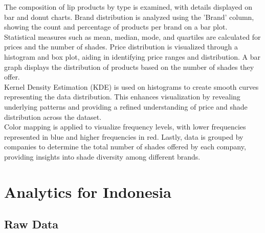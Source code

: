 \documentclass{article}
\begin{document}
\noindent The composition of lip products by type is examined, with details displayed on bar and donut charts. Brand distribution is analyzed using the 'Brand' column, showing the count and percentage of products per brand on a bar plot. \\

\noindent Statistical measures such as mean, median, mode, and quartiles are calculated for prices and the number of shades. Price distribution is visualized through a histogram and box plot, aiding in identifying price ranges and distribution. A bar graph displays the distribution of products based on the number of shades they offer. \\

\noindent Kernel Density Estimation (KDE) is used on histograms to create smooth curves representing the data distribution. This enhances visualization by revealing underlying patterns and providing a refined understanding of price and shade distribution across the dataset. \\

\noindent Color mapping is applied to visualize frequency levels, with lower frequencies represented in blue and higher frequencies in red. Lastly, data is grouped by companies to determine the total number of shades offered by each company, providing insights into shade diversity among different brands.

\section{Analytics for Indonesia}
\subsection{Raw Data}
\end{document}
